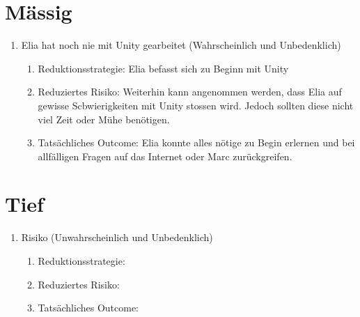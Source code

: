 \section{Mässig}
\begin{enumerate}
    \item Elia hat noch nie mit Unity gearbeitet (Wahrscheinlich und Unbedenklich)
    \begin{enumerate}
        \item Reduktionsstrategie: Elia befasst sich zu Beginn mit Unity
        \item Reduziertes Risiko: Weiterhin kann angenommen werden, dass Elia auf gewisse Scbwierigkeiten mit Unity stossen wird.
              Jedoch sollten diese nicht viel Zeit oder Mühe benötigen. 
        \item Tatsächliches Outcome: Elia konnte alles nötige zu Begin erlernen und bei allfälligen Fragen auf das Internet oder Marc zurückgreifen.
    \end{enumerate}
\end{enumerate}

\section{Tief}
\begin{enumerate}
    \item Risiko (Unwahrscheinlich und Unbedenklich)
    \begin{enumerate}
        \item Reduktionsstrategie: 
        \item Reduziertes Risiko:
        \item Tatsächliches Outcome:
    \end{enumerate}
\end{enumerate}